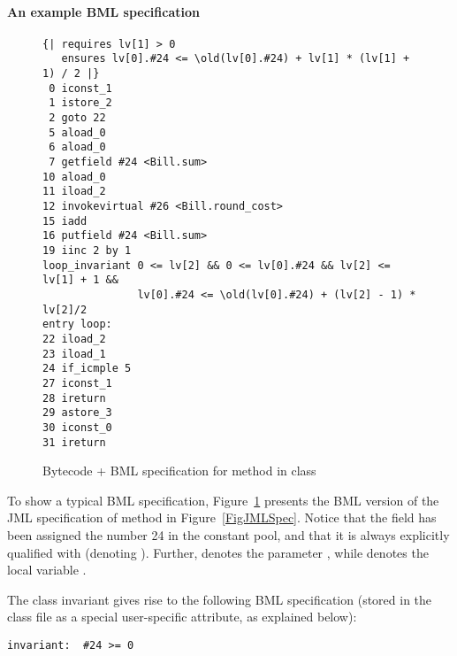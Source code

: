 

\paragraph{An example BML specification}
\label{sec:bml:example}


\begin{figure}[t]
{\small
\begin{verbatim}
{| requires lv[1] > 0 
   ensures lv[0].#24 <= \old(lv[0].#24) + lv[1] * (lv[1] + 1) / 2 |}
 0 iconst_1
 1 istore_2
 2 goto 22 
 5 aload_0
 6 aload_0
 7 getfield #24 <Bill.sum>
10 aload_0
11 iload_2
12 invokevirtual #26 <Bill.round_cost>
15 iadd
16 putfield #24 <Bill.sum>
19 iinc 2 by 1
loop_invariant 0 <= lv[2] && 0 <= lv[0].#24 && lv[2] <= lv[1] + 1 && 
               lv[0].#24 <= \old(lv[0].#24) + (lv[2] - 1) * lv[2]/2
entry loop: 
22 iload_2
23 iload_1
24 if_icmple 5 
27 iconst_1
28 ireturn
29 astore_3
30 iconst_0
31 ireturn
\end{verbatim}
}
\vspace*{-1em}\caption{Bytecode + BML specification for method  in class }\label{FigBMLSpec}
\end{figure}

To show a typical BML specification, Figure~\ref{FigBMLSpec} presents
the BML version of the JML specification of method
 in Figure~\ref{FigJMLSpec}. Notice that the
field
 has been assigned the number 24 in the constant
pool, and that it is always explicitly qualified with 
(denoting ). Further,  denotes the
parameter , while  denotes the local variable
.
 
The class invariant gives rise to the following BML specification
(stored in the class file as a special user-specific attribute, as
explained below):

\begin{verbatim}
invariant:  #24 >= 0
\end{verbatim}

